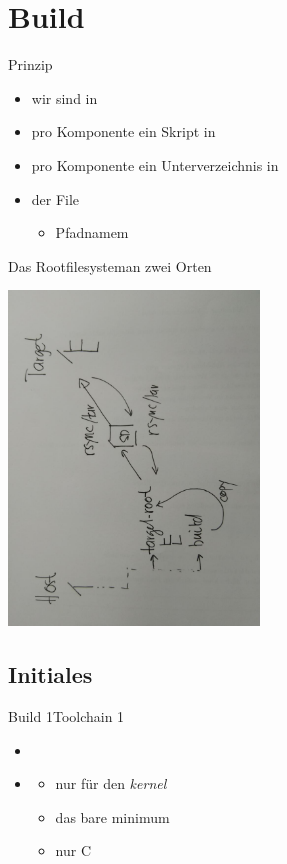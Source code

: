 \section{Build}
\begin{frame}{Prinzip}
 \begin{itemize}
  \item wir sind in 
  \item pro Komponente ein Skript in 
  \item pro Komponente ein Unterverzeichnis in 
  \item der File 
  \begin{itemize}
   \item Pfadnamem
  \end{itemize}
 \end{itemize}
\end{frame}

\begin{frame}{Das \target Rootfilesystem}{an zwei Orten}
\begin{center}
\includegraphics[width=0.5\textwidth,angle=-90]{rootfs.jpg}
\end{center}
\end{frame}

\subsection{Initiales \linux}
\begin{frame}{Build 1}{Toolchain 1}
 \begin{itemize}
  \item {}
  \item {} 
  \begin{itemize}
   \item nur für den {\em kernel}
   \item das bare minimum
   \item nur {\Large C}
  \end{itemize}
 \end{itemize}
\end{frame}

